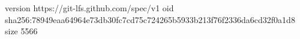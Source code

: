 version https://git-lfs.github.com/spec/v1
oid sha256:78949eaa64964e73db30fc7cd75c724265b5933b213f76f2336da6cd32f0a1d8
size 5566
